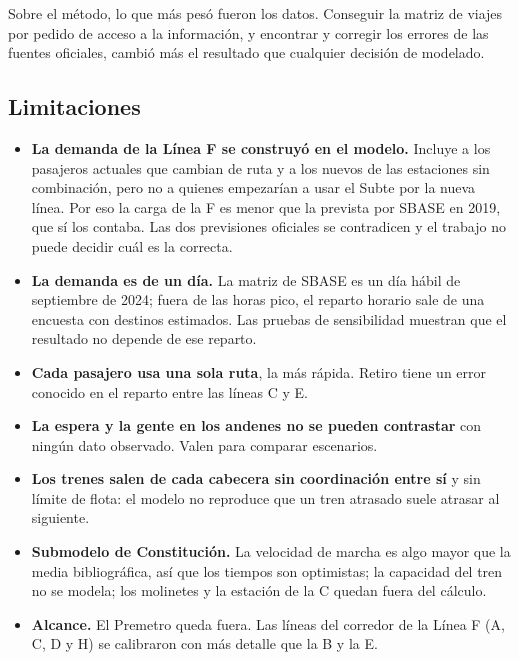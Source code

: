 \documentclass{article}
\begin{document}
Sobre el método, lo que más pesó fueron los datos. Conseguir la matriz de viajes por pedido de acceso a la
información, y encontrar y corregir los errores de las fuentes oficiales, cambió más el resultado que
cualquier decisión de modelado.

\subsection{Limitaciones}
\label{sec:limitaciones}

\begin{itemize}
  \item \textbf{La demanda de la Línea F se construyó en el modelo.} Incluye a los pasajeros actuales que
    cambian de ruta y a los nuevos de las estaciones sin combinación, pero no a quienes empezarían a usar el
    Subte por la nueva línea. Por eso la carga de la F es menor que la prevista por SBASE en 2019, que sí los
    contaba. Las dos previsiones oficiales se contradicen y el trabajo no puede decidir cuál es la correcta.
  \item \textbf{La demanda es de un día.} La matriz de SBASE es un día hábil de septiembre de 2024; fuera de
    las horas pico, el reparto horario sale de una encuesta con destinos estimados. Las pruebas de
    sensibilidad muestran que el resultado no depende de ese reparto.
  \item \textbf{Cada pasajero usa una sola ruta}, la más rápida. Retiro tiene un error conocido en el reparto
    entre las líneas C y E.
  \item \textbf{La espera y la gente en los andenes no se pueden contrastar} con ningún dato observado. Valen
    para comparar escenarios.
  \item \textbf{Los trenes salen de cada cabecera sin coordinación entre sí} y sin límite de flota: el modelo
    no reproduce que un tren atrasado suele atrasar al siguiente.
  \item \textbf{Submodelo de Constitución.} La velocidad de marcha es algo mayor que la media bibliográfica,
    así que los tiempos son optimistas; la capacidad del tren no se modela; los molinetes y la estación de la C
    quedan fuera del cálculo.
  \item \textbf{Alcance.} El Premetro queda fuera. Las líneas del corredor de la Línea F (A, C, D y H) se
    calibraron con más detalle que la B y la E.
\end{itemize}

\end{document}
